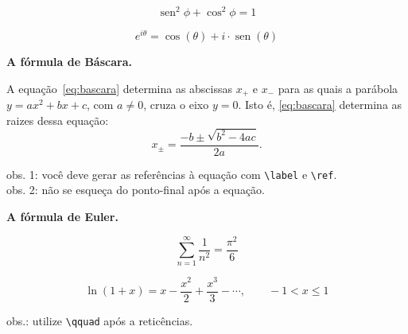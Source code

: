 \documentclass[a4paper,10pt,twocolumn,landscape]{article}
\DeclareMathOperator{\sen}{sen}
\begin{document}
		
	\begin{exercicio}	
	
		\[
		\sen^2 \phi + \cos^2 \phi = 1
		\]		
	\end{exercicio}
	
	
	\begin{exercicio}
	
		\[
		e^{i\theta} = \cos(\theta) + i\cdot\sen(\theta)
		\]
	\end{exercicio}
	
	
	\begin{exercicio} \textbf{A fórmula de Báscara.}
	
		A equação~\ref{eq:bascara} determina as abscissas $x_+$ e $x_-$ para as quais a parábola \(y = a x^2 + bx + c\), com \(a \ne 0\), cruza o eixo $y = 0$. Isto é, \eqref{eq:bascara} determina as raizes dessa equação:
		\begin{equation}\label{eq:bascara}
		x_\pm = \frac{-b \pm \sqrt{b^2 - 4ac}}{2a}.
		\end{equation}
		
	\bigskip	
	\noindent obs. 1: você deve gerar as referências à equação com \verb|\label| e \verb|\ref|.\\
	obs. 2: não se esqueça do ponto-final após a equação.
	\end{exercicio}
	
	
	\begin{exercicio} \textbf{A fórmula de Euler.}
	
		\[
		\sum_{n = 1}^\infty \frac{1}{n^2} = \frac{\pi^2}{6}
		\]
	\end{exercicio}
	
	
	\begin{exercicio}\label{ex:ln}
	
		\[
		\ln (1 + x) = x - \frac{x^2}{2} + \frac{x^3}{3} - \cdots, \qquad -1 < x \le 1
		\]
		
	\bigskip
	\noindent obs.: utilize \verb|\qquad| após a reticências.
	\end{exercicio}
	
\end{document}
